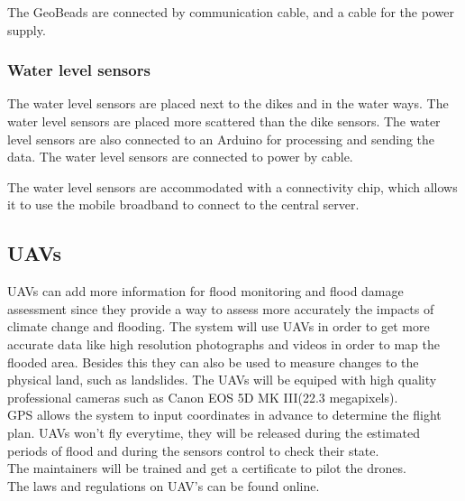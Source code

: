 The GeoBeads are connected by communication cable, and a cable for the power supply. 

\subsubsection*{Water level sensors}
The water level sensors are placed next to the dikes and in the water ways. The water level sensors are placed more scattered than the dike sensors. The water level sensors are also connected to an Arduino for processing and sending the data. The water level sensors are connected to power by cable.

The water level sensors are accommodated with a connectivity chip, which allows it to use the mobile broadband to connect to the central server.



\subsection{UAVs }

UAVs can add more information for flood monitoring and flood damage assessment since they provide a way to assess more accurately the impacts of climate change and flooding. The system will use UAVs in order to get more accurate data like high resolution photographs and videos in order to map the flooded area. Besides this they can also be used to measure changes to the physical land, such as landslides. The UAVs will be equiped with high quality professional cameras such as Canon EOS 5D MK III(22.3 megapixels).\\
GPS allows the system to input coordinates in advance to determine the flight plan.
UAVs won't fly everytime, they will be released during the estimated periods of flood and during the sensors control to check their state.  \\
The maintainers will be trained and get a certificate to pilot the drones.\\
The laws and regulations on UAV's can be found online. \cite{UAVregulation}



\clearpage
